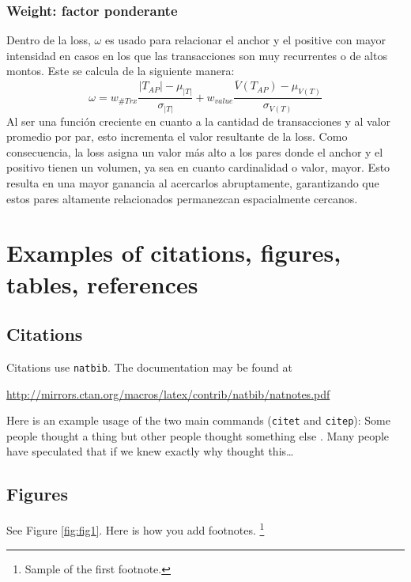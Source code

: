 \documentclass{article}
\begin{document}
\subsubsection{Weight: factor ponderante}
Dentro de la loss, $\omega$ es usado para relacionar el anchor y el positive con mayor intensidad en casos en los que las transacciones son muy recurrentes o de altos montos. Este se calcula de la siguiente manera:
\begin{equation}
	\omega = w_{\#Trx} \frac{|T_{AP}| - \mu_{|T|} }{\sigma_{|T|}} + w_{value} \frac{\overline{V}(T_{AP}) - \mu_{V(T)}}{\sigma_{V(T)}}
\end{equation}
Al ser una función creciente en cuanto a la cantidad de transacciones y al valor promedio por par, esto incrementa el valor resultante de la loss. Como consecuencia, la loss asigna un valor más alto a los pares donde el anchor y el positivo tienen un volumen, ya sea en cuanto cardinalidad o valor, mayor. Esto resulta en una mayor ganancia al acercarlos abruptamente, garantizando que estos pares altamente relacionados permanezcan espacialmente cercanos.





\section{Examples of citations, figures, tables, references}
\label{sec:others}

\subsection{Citations}
Citations use \verb+natbib+. The documentation may be found at
\begin{center}
	\url{http://mirrors.ctan.org/macros/latex/contrib/natbib/natnotes.pdf}
\end{center}

Here is an example usage of the two main commands (\verb+citet+ and \verb+citep+): Some people thought a thing \citep{kour2014real, keshet2016prediction} but other people thought something else \citep{kour2014fast}. Many people have speculated that if we knew exactly why \citet{kour2014fast} thought this\dots

\subsection{Figures}
\lipsum[10]
See Figure \ref{fig:fig1}. Here is how you add footnotes. \footnote{Sample of the first footnote.}
\lipsum[11]
\end{document}
